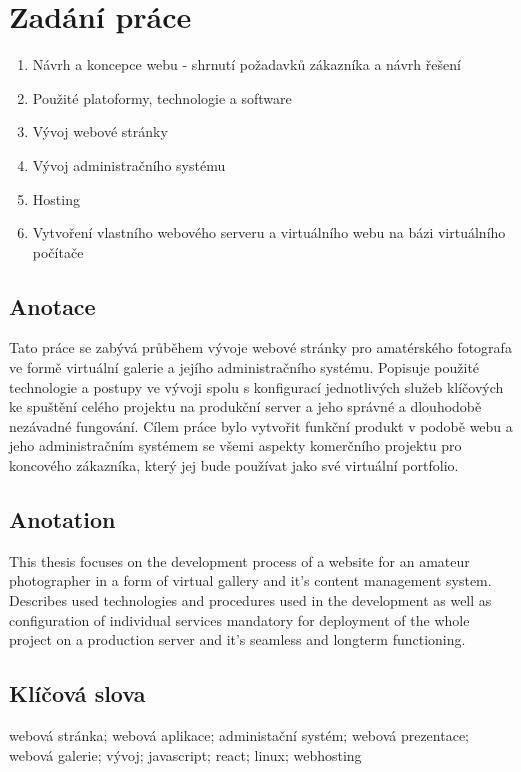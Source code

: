 \documentclass[12pt,a4paper]{report}
\begin{document}
  \chapter*{Zadání práce}
  \begin{enumerate}
    \item Návrh a koncepce webu - shrnutí požadavků zákazníka a návrh řešení
    \item Použité platoformy, technologie a software
    \item Vývoj webové stránky
    \item Vývoj administračního systému
    \item Hosting
    \item Vytvoření vlastního webového serveru a virtuálního webu na bázi virtuálního počítače
  \end{enumerate}
  \clearpage


  \section*{Anotace}
  Tato práce se zabývá průběhem vývoje webové stránky pro amatérského 
  fotografa ve formě virtuální galerie a jejího administračního systému.
  Popisuje použité technologie a postupy ve vývoji spolu s konfigurací
  jednotlivých služeb klíčových ke spuštění celého projektu
  na produkční server a jeho správné a dlouhodobě nezávadné fungování.
  Cílem práce bylo vytvořit funkční produkt v podobě webu a jeho administračním
  systémem se všemi aspekty komerčního projektu pro koncového zákazníka, 
  který jej bude používat jako své virtuální portfolio.
  
  \section*{Anotation}
  This thesis focuses on the development process of a website for an amateur photographer
  in a form of virtual gallery and it's content management system. Describes used technologies
  and procedures used in the development as well as configuration of individual services mandatory for
  deployment of the whole project on a production server and it's seamless and longterm functioning.

  \section*{Klíčová slova}
  
  \noindent webová stránka; webová aplikace; administační systém; webová prezentace; webová galerie; vývoj; javascript; react; linux; webhosting
  
\end{document}
